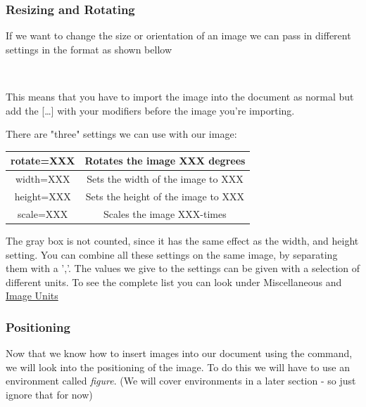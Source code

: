 \subsubsection{Resizing and Rotating}
If we want to change the size or orientation of an image we can pass in different settings in the format as shown bellow

\begin{center}
 \\
\end{center}

This means that you have to import the image into the document as normal but add the [\ldots] with your modifiers
before the image you're importing. 

There are "three" settings we can use with our image:
\begin{table}[H]
    \centering
    \begin{tabular}{|c|c|} \hline
        rotate=XXX & Rotates the image XXX degrees \\ \hline
        width=XXX & Sets the width of the image to XXX \\ \hline
        height=XXX & Sets the height of the image to XXX \\ \hline
        \rowcolor{gray!30}
        scale=XXX & Scales the image XXX-times \\ \hline
    \end{tabular}
\end{table} %

The gray box is not counted, since it has the same effect as the width, and height setting.
You can combine all these settings on the same image, by separating them with a ','. The values we give to the settings 
can be given with a selection of different units. To see the complete list you can look under Miscellaneous and \hyperref[secc:Image-Units]{Image Units}

\subsubsection{Positioning}
Now that we know how to insert images into our document using the  command, we will
look into the positioning of the image. To do this we will have to use an environment called \textit{figure}.
(We will cover environments in a later section - so just ignore that for now)

